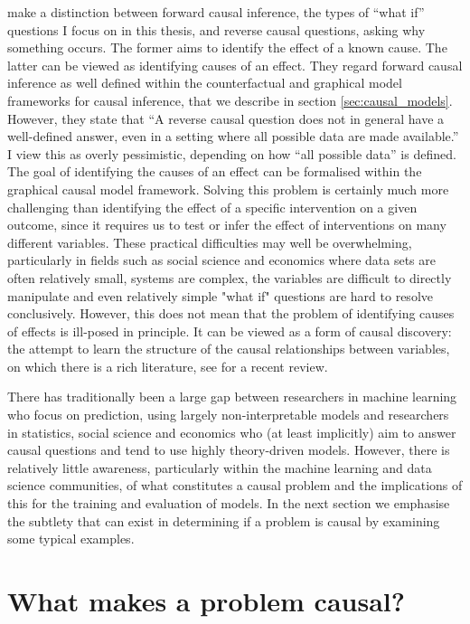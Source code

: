 \documentclass[11pt,a4paper,twoside]{report}
\newcommand{\quotes}[1]{``#1''}
\theoremstyle{plain}
\theoremstyle{definition}
\begin{document}
\citet{Gelman2010,gelman2013ask} make a distinction between forward causal inference, the types of \quotes{what if} questions I focus on in this thesis, and reverse causal questions, asking why something occurs. The former aims to identify the effect of a known cause. The latter can be viewed as identifying causes of an effect. They regard forward causal inference as well defined within the counterfactual and graphical model frameworks for causal inference, that we describe in section \ref{sec:causal_models}. However, they state that \quotes{A reverse causal question does not in general have a well-defined answer, even in a setting where all possible data are made available.} I view this as overly pessimistic, depending on how \quotes{all possible data} is defined. The goal of identifying the causes of an effect can be formalised within the graphical causal model framework. Solving this problem is certainly much more challenging than identifying the effect of a specific intervention on a given outcome, since it requires us to test or infer the effect of interventions on many different variables. These practical difficulties may well be overwhelming, particularly in fields such as social science and economics where data sets are often relatively small, systems are complex, the variables are difficult to directly manipulate and even relatively simple "what if" questions are hard to resolve conclusively. However, this does not mean that the problem of identifying causes of effects is ill-posed in principle. It can be viewed as a form of causal discovery: the attempt to learn the structure of the causal relationships between variables, on which there is a rich literature, see \citet{Spirtes2016} for a recent review.


There has traditionally been a large gap between researchers in machine learning who focus on prediction, using largely non-interpretable models and researchers in statistics, social science and economics who (at least implicitly) aim to answer causal questions and tend to use highly theory-driven models. However, there is relatively little awareness, particularly within the machine learning and data science communities, of what constitutes a causal problem and the implications of this for the training and evaluation of models. In the next section we emphasise the subtlety that can exist in determining if a problem is causal by examining some typical examples. 

\section{What makes a problem causal?}
\end{document}
